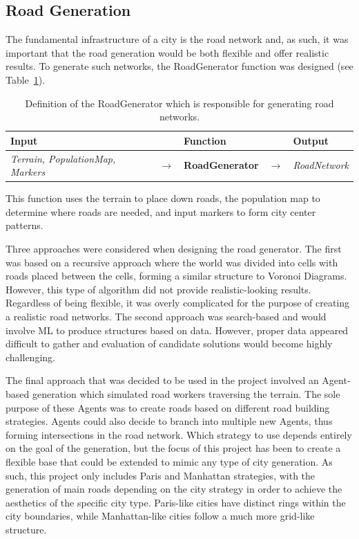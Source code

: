 \subsection{Road Generation}

The fundamental infrastructure of a city is the road network and, as such, it was important that the road generation would be both flexible and offer realistic results.
To generate such networks, the RoadGenerator function was designed (see Table~\ref{table:def_roadgen}).

\begin{table}[H]
  \centering
  \begin{tabular}{lllll}
    \textbf{Input} & & \textbf{Function} & & \textbf{Output} \\
    \midrule
    \textit{Terrain, PopulationMap, Markers} & $\rightarrow$ & \textbf{RoadGenerator}       & $\rightarrow$ & \textit{RoadNetwork}    \\
    \bottomrule
  \end{tabular}

  \caption{Definition of the RoadGenerator which is responsible for generating road networks.}
  \label{table:def_roadgen}
\end{table}
\vspace{-0.4cm}

This function uses the terrain to place down roads, the population map to determine where roads are needed, and input markers to form city center patterns.

Three approaches were considered when designing the road generator.
The first was based on a recursive approach where the world was divided into cells with roads placed between the cells, forming a similar structure to Voronoi Diagrams.
However, this type of algorithm did not provide realistic-looking results.
Regardless of being flexible, it was overly complicated for the purpose of creating a realistic road networks.
The second approach was search-based and would involve ML to produce structures based on data.
However, proper data appeared difficult to gather and evaluation of candidate solutions would become highly challenging.

The final approach that was decided to be used in the project involved an Agent-based generation which simulated road workers traversing the terrain.
The sole purpose of these Agents was to create roads based on different road building strategies.
Agents could also decide to branch into multiple new Agents, thus forming intersections in the road network.
Which strategy to use depends entirely on the goal of the generation, but the focus of this project has been to create a flexible base that could be extended to mimic any type of city generation.
As such, this project only includes Paris and Manhattan strategies, with the generation of main roads depending on the city strategy in order to achieve the aesthetics of the specific city type.
Paris-like cities have distinct rings within the city boundaries, while Manhattan-like cities follow a much more grid-like structure.

